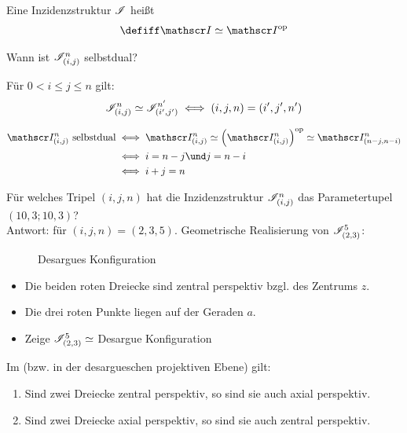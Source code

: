 \begin{definition}
	Eine Inzidenzstruktur $\mathscr{I}$ heißt 
	\begin{align*}
		\defiff\Inz\simeq\Inz^\op
	\end{align*}
\end{definition}

Wann ist $\mathscr{I}_{(i,j)}^n$ selbstdual?

\begin{lemma}
	Für $0<i\leq j\leq n$ gilt:
	\begin{align*}
		\mathscr{I}_{(i,j)}^n\simeq\mathscr{I}_{(i',j')}^{n'}\iff
		(i,j,n)=(i',j',n')
	\end{align*}
\end{lemma}

\begin{satz}
	\begin{align*}
		\Inz_{(i,j)}^n\text{ selbstdual}
		&\iff \Inz_{(i,j)}^n\simeq\Big(\Inz_{(i,j)}^n\Big)^\op\simeq \Inz_{(n-j,n-i)}^n\\
		&\iff i=n-j\und j=n-i\\
		&\iff i+j=n
	\end{align*}
\end{satz}

\begin{beispiel}
	Für welches Tripel $(i,j,n)$ hat die Inzidenzstruktur $\mathscr{I}_{(i,j)}^n$ das Parametertupel $(10,3;10,3)$?\\
	Antwort: für $(i,j,n)=(2,3,5)$.
	Geometrische Realisierung von $\mathscr{I}_{(2,3)}^5$:
	\begin{figure}[H] %
		\begin{center}
			
			\caption{Desargues Konfiguration}
		\end{center}
	\end{figure}
	\begin{itemize}
		\item Die beiden roten Dreiecke sind zentral perspektiv bzgl. des Zentrums $z$.
		\item Die drei roten Punkte liegen auf der Geraden $a$.
		\item Zeige $\mathscr{I}_{(2,3)}^5\simeq$ Desargue Konfiguration
	\end{itemize}
\end{beispiel}

\begin{theorem}\enter
	Im  (bzw. in der desargueschen projektiven Ebene) gilt:
	\begin{enumerate}
		\item Sind zwei Dreiecke zentral perspektiv, so sind sie auch axial perspektiv.
		\item Sind zwei Dreiecke axial perspektiv, so sind sie auch zentral perspektiv.
	\end{enumerate}
\end{theorem}

